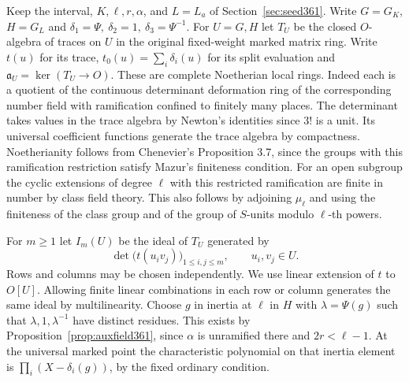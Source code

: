 \documentclass[a4paper,11pt]{article}
\theoremstyle{definition}
\theoremstyle{remark}
\numberwithin{equation}{section}
\begin{document}
Keep the interval, \(K,\ell,r,\alpha\), and \(L=L_a\) of
Section~\ref{sec:seed361}. Write \(G=G_K\), \(H=G_L\) and
\(\delta_1=\Psi,\ \delta_2=1,\ \delta_3=\Psi^{-1}\).
For \(U=G,H\) let \(T_U\) be the closed \(O\)-algebra of traces
on \(U\) in the original fixed-weight marked matrix ring. Write
\(t(u)\) for its trace, \(t_0(u)=\sum_i\delta_i(u)\) for its
split evaluation and \(\mathfrak a_U=\ker(T_U\to O)\).
These are complete Noetherian local rings. Indeed each is a
quotient of the continuous determinant deformation ring of the
corresponding number field with ramification confined to finitely
many places. The determinant takes values in the trace algebra
by Newton's identities since \(3!\) is a unit. Its universal
coefficient functions generate the trace algebra by compactness.
Noetherianity follows from Chenevier's Proposition 3.7, since
the groups with this ramification restriction satisfy Mazur's
finiteness condition. For an open subgroup the cyclic extensions
of degree \(\ell\) with this restricted ramification are finite
in number by class field theory. This also follows by adjoining
\(\mu_\ell\) and using the finiteness of the class group and of
the group of \(S\)-units modulo \(\ell\)-th powers.~\cite{VII-V-chenevier364}

For \(m\ge1\) let \(I_m(U)\) be the ideal of \(T_U\) generated by
\[
   \det\bigl(t(u_i v_j)\bigr)_{1\le i,j\le m},
           \qquad u_i,v_j\in U .
\]
Rows and columns may be chosen independently. We use linear
extension of \(t\) to \(O[U]\). Allowing finite linear
combinations in each row or column generates the same ideal
by multilinearity. Choose \(g\) in inertia at \(\ell\) in \(H\)
with \(\lambda=\Psi(g)\) such that \(\lambda,1,\lambda^{-1}\)
have distinct residues. This exists by
Proposition~\ref{prop:auxfield361}, since \(\alpha\) is
unramified there and \(2r<\ell-1\). At the universal marked
point the characteristic polynomial on that inertia element is
\(\prod_i(X-\delta_i(g))\), by the fixed ordinary condition.
\end{document}
